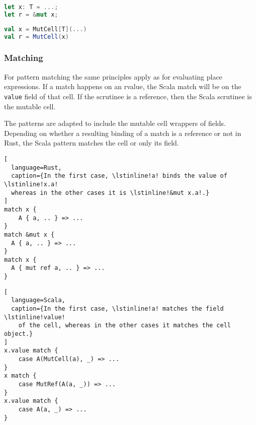 \noindent\begin{minipage}[t]{.45\textwidth}
\begin{lstlisting}[language=Rust]
let x: T = ...;
let r = &mut x;
\end{lstlisting}
\end{minipage}\hfill
\begin{minipage}[t]{.45\textwidth}
\begin{lstlisting}[language=Scala]
val x = MutCell[T](...)
val r = MutCell(x)
\end{lstlisting}
\end{minipage}

\subsubsection{\texorpdfstring{\textbf{Matching}}{Matching}}

For pattern matching the same principles apply as for evaluating place
expressions. If a match happens on an rvalue, the Scala match will be on
the \passthrough{\lstinline!value!} field of that cell. If the scrutinee
is a reference, then the Scala scrutinee is the mutable cell.

The patterns are adapted to include the mutable cell wrappers of fields.
Depending on whether a resulting binding of a match is a reference or
not in Rust, the Scala pattern matches the cell or only its field.

\noindent\begin{minipage}[t]{.45\textwidth}
\begin{lstlisting}[
  language=Rust,
  caption={In the first case, \lstinline!a! binds the value of \lstinline!x.a!
  whereas in the other cases it is \lstinline!&mut x.a!.}
]
match x {
    A { a, .. } => ...
}
match &mut x {
  A { a, .. } => ...
}
match x {
  A { mut ref a, .. } => ...
}
\end{lstlisting}
\end{minipage}\hfill
\begin{minipage}[t]{.45\textwidth}
\begin{lstlisting}[
  language=Scala,
  caption={In the first case, \lstinline!a! matches the field \lstinline!value!
    of the cell, whereas in the other cases it matches the cell object.}
]
x.value match {
    case A(MutCell(a), _) => ...
}
x match {
    case MutRef(A(a, _)) => ...
}
x.value match {
    case A(a, _) => ...
}
\end{lstlisting}
\end{minipage}

